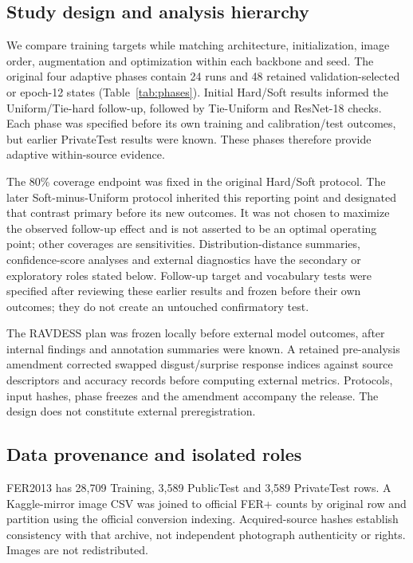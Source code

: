 \subsection{Study design and analysis hierarchy}
We compare training targets while matching architecture, initialization, image order, augmentation and optimization within each backbone and seed. The original four adaptive phases contain 24 runs and 48 retained validation-selected or epoch-12 states (Table~\ref{tab:phases}). Initial Hard/Soft results informed the Uniform/Tie-hard follow-up, followed by Tie-Uniform and ResNet-18 checks. Each phase was specified before its own training and calibration/test outcomes, but earlier PrivateTest results were known. These phases therefore provide adaptive within-source evidence.

The 80\% coverage endpoint was fixed in the original Hard/Soft protocol. The later Soft-minus-Uniform protocol inherited this reporting point and designated that contrast primary before its new outcomes. It was not chosen to maximize the observed follow-up effect and is not asserted to be an optimal operating point; other coverages are sensitivities. Distribution-distance summaries, confidence-score analyses and external diagnostics have the secondary or exploratory roles stated below. Follow-up target and vocabulary tests were specified after reviewing these earlier results and frozen before their own outcomes; they do not create an untouched confirmatory test.

The RAVDESS plan was frozen locally before external model outcomes, after internal findings and annotation summaries were known. A retained pre-analysis amendment corrected swapped disgust/surprise response indices against source descriptors and accuracy records before computing external metrics. Protocols, input hashes, phase freezes and the amendment accompany the release. The design does not constitute external preregistration.


\subsection{Data provenance and isolated roles}
FER2013 has 28,709 Training, 3,589 PublicTest and 3,589 PrivateTest rows. A Kaggle-mirror image CSV was joined to official FER+ counts by original row and partition using the official conversion indexing. Acquired-source hashes establish consistency with that archive, not independent photograph authenticity or rights. Images are not redistributed.

